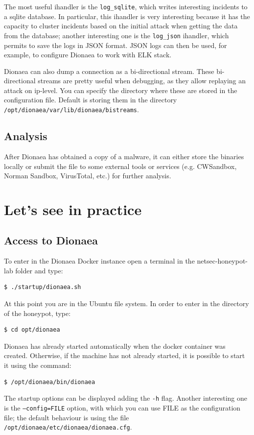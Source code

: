 \documentclass[epsfig,a4paper,11pt,titlepage,oneside,openany]{book}
\begin{document}
The most useful ihandler is the \texttt{log\_sqlite}, which writes interesting incidents to a sqlite database. In particular, this ihandler is very interesting because it has the capacity to cluster incidents based on the initial attack when getting the data from the database; another interesting one is the \texttt{log\_json} ihandler, which permits to save the logs in JSON format. JSON logs can then be used, for example, to configure Dionaea to work with ELK stack.

Dionaea can also dump a connection as a bi-directional stream. These bi-directional streams are pretty useful when debugging, as they allow replaying an attack on ip-level. You can specify the directory where these are stored in the configuration file. Default is storing them in the directory \texttt{/opt/dionaea/var/lib/dionaea/bistreams}.

\subsection{Analysis}

After Dionaea has obtained a copy of a malware, it can either store the binaries locally or submit the file to some external tools or services (e.g. CWSandbox, Norman Sandbox, VirusTotal, etc.) for further analysis.

\section{Let's see in practice}

\subsection{Access to Dionaea}


To enter in the Dionaea Docker instance open a terminal in the netsec-honeypot-lab folder and type:

\begin{lstlisting}[language=bash]
$ ./startup/dionaea.sh
\end{lstlisting}

\noindent At this point you are in the Ubuntu file system. In order to enter in the directory of the honeypot, type:
\begin{lstlisting}[language=bash]
$ cd opt/dionaea
\end{lstlisting}

\noindent Dionaea has already started automatically when the docker container was created. Otherwise, if the machine has not already started, it is possible to start it using the command:
\begin{lstlisting}[language=bash]
$ /opt/dionaea/bin/dionaea
\end{lstlisting}
The startup options can be displayed adding the \texttt{-h} flag. Another interesting one is the \texttt{--config=FILE} option, with which you can use FILE as the configuration file; the default behaviour is using the file \texttt{/opt/dionaea/etc/dionaea/dionaea.cfg}.
\end{document}
